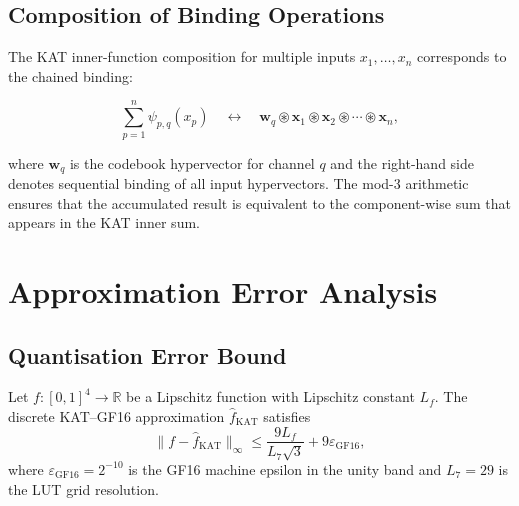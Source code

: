 \subsection{Composition of Binding Operations}

The KAT inner-function composition for multiple inputs
$x_1, \ldots, x_n$ corresponds to the chained binding:

\[
\sum_{p=1}^{n} \psi_{p,q}(x_p) \quad \longleftrightarrow \quad
\mathbf{w}_q \circledast \mathbf{x}_1 \circledast \mathbf{x}_2 \circledast \cdots \circledast \mathbf{x}_n,
\]

where $\mathbf{w}_q$ is the codebook hypervector for channel $q$ and
the right-hand side denotes sequential binding of all input
hypervectors. The mod-3 arithmetic ensures that the accumulated result
is equivalent to the component-wise sum that appears in the KAT inner
sum.

\section{Approximation Error Analysis}
\label{app:G-approx-error}

\subsection{Quantisation Error Bound}

\begin{theorem}
\label{thm:G-approx-error}
Let $f\colon [0,1]^4 \to \mathbb{R}$ be a Lipschitz function with
Lipschitz constant $L_f$. The discrete KAT--GF16 approximation
$\hat{f}_{\mathrm{KAT}}$ satisfies
\[
\|f - \hat{f}_{\mathrm{KAT}}\|_\infty \leq \frac{9 L_f}{L_7 \sqrt{3}} + 9 \varepsilon_{\mathrm{GF16}},
\]
where $\varepsilon_{\mathrm{GF16}} = 2^{-10}$ is the GF16 machine
epsilon in the unity band and $L_7 = 29$ is the LUT grid resolution.
\end{theorem}

